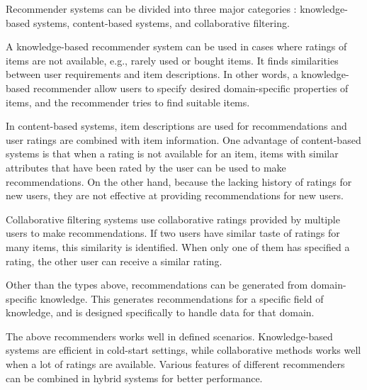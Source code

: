 {Recommender systems can be divided into three major categories \cite{aggarwal:2016}: knowledge-based systems, content-based systems, and collaborative filtering.

A knowledge-based recommender system
can be used in cases where ratings of items are not available, e.g., rarely used or bought items.
It finds similarities between user requirements and item descriptions.
In other words, a knowledge-based recommender allow users to specify desired domain-specific properties of items, and the recommender tries to find suitable items.

In content-based systems,
item descriptions are used for recommendations and user ratings are combined with item information.
One advantage of content-based systems is that when a rating is not available for an item, items with similar attributes that have been rated by the user can be used to make recommendations.
On the other hand, because the lacking history of ratings for new users, they are not effective at providing recommendations for new users. 

Collaborative filtering systems
use collaborative ratings provided by multiple users to make recommendations. %
If two users have similar taste of ratings for many items, this similarity is identified. When only one of them has specified a rating, the other user can receive a similar rating. 

Other than the types above,
recommendations can be generated from domain-specific knowledge.
This generates recommendations for a specific field of knowledge,
and is designed specifically to handle data for that domain.

The above recommenders works well in defined scenarios. Knowledge-based systems are efficient in cold-start settings, while collaborative methods works well when a lot of ratings are available. Various features of different recommenders can be combined in hybrid systems for better performance. 

}
